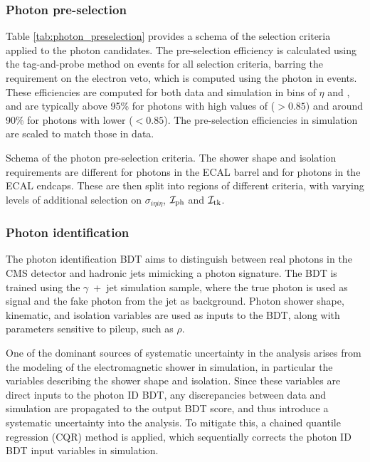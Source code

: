 \subsubsection{Photon pre-selection}\label{sec:photon_preselection}
Table \ref{tab:photon_preselection} provides a schema of the selection criteria applied to the photon candidates. The pre-selection efficiency is calculated using the tag-and-probe method on \Zee events for all selection criteria, barring the requirement on the electron veto, which is computed using the photon in \Zmumug events. These efficiencies are computed for both data and simulation in bins of $\eta$ and \RNINE, and are typically above 95\% for photons with high values of \RNINE ($>0.85$) and around 90\% for photons with lower \RNINE ($<0.85$). The pre-selection efficiencies in simulation are scaled to match those in data.

\begin{table}[htb!]
    \caption[Schema of the photon pre-selection criteria]{Schema of the photon pre-selection criteria. The shower shape and isolation requirements are different for photons in the ECAL barrel and for photons in the ECAL endcaps. These are then split into regions of different \RNINE criteria, with varying levels of additional selection on $\sigma_{i\eta i\eta}$, $\mathcal{I}_{\rm{ph}}$ and $\mathcal{I}_{\rm{tk}}$.}
    \label{tab:photon_preselection}
    \vspace{.5cm}
    \centering
    \scriptsize
    \renewcommand{\arraystretch}{1.5}
    
\end{table}


\subsubsection{Photon identification}
The photon identification BDT aims to distinguish between real photons in the CMS detector and hadronic jets mimicking a photon signature. The BDT is trained using the $\gamma$~+~jet simulation sample, where the true photon is used as signal and the fake photon from the jet as background. Photon shower shape, kinematic, and isolation variables are used as inputs to the BDT, along with parameters sensitive to pileup, such as $\rho$. 

One of the dominant sources of systematic uncertainty in the \Hgg analysis arises from the modeling of the electromagnetic shower in simulation, in particular the variables describing the shower shape and isolation. Since these variables are direct inputs to the photon ID BDT, any discrepancies between data and simulation are propagated to the output BDT score, and thus introduce a systematic uncertainty into the analysis. To mitigate this, a chained quantile regression (CQR) method is applied, which sequentially corrects the photon ID BDT input variables in simulation. 

